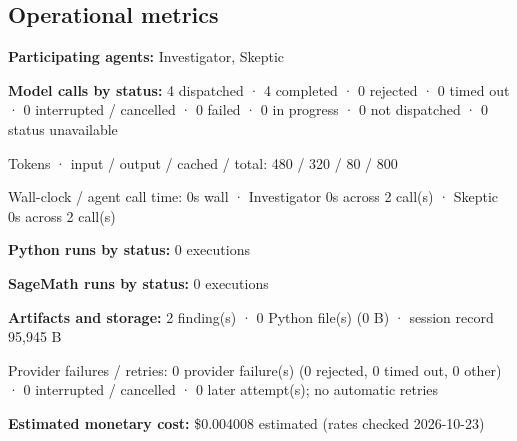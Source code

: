 \documentclass[11pt]{article}
\begin{document}
\subsection{Operational metrics}
\textbf{Participating agents:} Investigator, Skeptic\par
\textbf{Model calls by status:} 4 dispatched · 4 completed · 0 rejected · 0 timed out · 0 interrupted / cancelled · 0 failed · 0 in progress · 0 not dispatched · 0 status unavailable\par
Tokens · input / output / cached / total: 480 / 320 / 80 / 800\par
Wall-clock / agent call time: 0s wall · Investigator 0s across 2 call(s) · Skeptic 0s across 2 call(s)\par
\textbf{Python runs by status:} 0 executions\par
\textbf{SageMath runs by status:} 0 executions\par
\textbf{Artifacts and storage:} 2 finding(s) · 0 Python file(s) (0 B) · session record 95,945 B\par
Provider failures / retries: 0 provider failure(s) (0 rejected, 0 timed out, 0 other) · 0 interrupted / cancelled · 0 later attempt(s); no automatic retries\par
\textbf{Estimated monetary cost:} \$0.004008 estimated (rates checked 2026-10-23)\par
\end{document}
